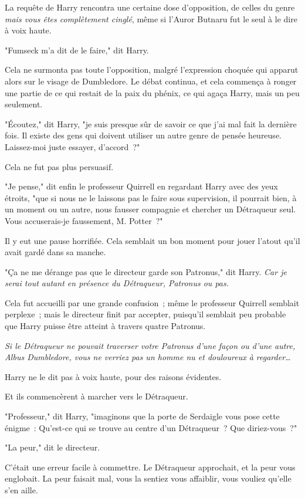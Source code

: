 \later

La requête de Harry rencontra une certaine dose d'opposition, de celles du genre \emph{mais vous êtes complètement cinglé}, même si l'Auror Butnaru fut le seul à le dire à voix haute.

"Fumseck m'a dit de le faire," dit Harry.

Cela ne surmonta pas toute l'opposition, malgré l'expression choquée qui apparut alors sur le visage de Dumbledore. Le débat continua, et cela commença à ronger une partie de ce qui restait de la paix du phénix, ce qui agaça Harry, mais un peu seulement.

"Écoutez," dit Harry, "je suis presque sûr de savoir ce que j'ai mal fait la dernière fois. Il existe des gens qui doivent utiliser un autre genre de pensée heureuse. Laissez-moi juste essayer, d'accord~?"

Cela ne fut pas plus persuasif.

"Je pense," dit enfin le professeur Quirrell en regardant Harry avec des yeux étroits, "que si nous ne le laissons pas le faire sous supervision, il pourrait bien, à un moment ou un autre, nous fausser compagnie et chercher un Détraqueur seul. Vous accuserais-je faussement, M. Potter~?"

Il y eut une pause horrifiée. Cela semblait un bon moment pour jouer l'atout qu'il avait gardé dans sa manche.

"Ça ne me dérange pas que le directeur garde son Patronus," dit Harry. \emph{Car je serai tout autant en présence du Détraqueur, Patronus ou pas.}

Cela fut accueilli par une grande confusion~; même le professeur Quirrell semblait perplexe~; mais le directeur finit par accepter, puisqu'il semblait peu probable que Harry puisse être atteint à travers quatre Patronus.

\emph{Si le Détraqueur ne pouvait traverser votre Patronus d'une façon ou d'une autre, Albus Dumbledore, vous ne verriez pas un homme nu et douloureux à regarder…}

Harry ne le dit pas à voix haute, pour des raisons évidentes.

Et ils commencèrent à marcher vers le Détraqueur.

"Professeur," dit Harry, "imaginons que la porte de Serdaigle vous pose cette énigme~: Qu'est-ce qui se trouve au centre d'un Détraqueur~? Que diriez-vous~?"

"La peur," dit le directeur.

C'était une erreur facile à commettre. Le Détraqueur approchait, et la peur vous englobait. La peur faisait mal, vous la sentiez vous affaiblir, vous vouliez qu'elle s'en aille.

